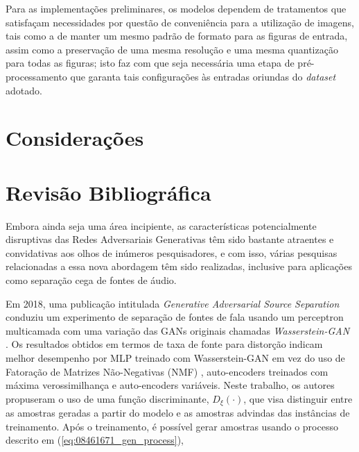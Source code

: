 Para as implementações preliminares, os modelos dependem de tratamentos que satisfaçam necessidades por questão de conveniência para a utilização de imagens, tais como a de manter um mesmo padrão de formato para as figuras de entrada, assim como a preservação de uma mesma resolução e uma mesma quantização para todas as figuras; isto faz com que seja necessária uma etapa de pré-processamento que garanta tais configurações às entradas oriundas do \textit{dataset} adotado.



\section{Considerações}
\label{sec:gan_for_bss_considerations}



\section{Revisão Bibliográfica}
\label{sec:gan_for_bss_bib_review}

Embora ainda seja uma área incipiente, as características potencialmente disruptivas das Redes Adversariais Generativas têm sido bastante atraentes e convidativas aos olhos de inúmeros pesquisadores, e com isso, várias pesquisas relacionadas a essa nova abordagem têm sido realizadas, inclusive para aplicações como separação cega de fontes de áudio.

Em 2018, uma publicação intitulada \textit{Generative Adversarial Source Separation} \citep{8461671} conduziu um experimento de separação de fontes de fala usando um perceptron multicamada com uma variação das GANs originais chamadas \textit{Wasserstein-GAN} \citep{arjovsky2017wasserstein}. Os resultados obtidos em termos de taxa de fonte para distorção indicam melhor desempenho por MLP treinado com Wasserstein-GAN em vez do uso de Fatoração de Matrizes Não-Negativas (NMF) \citep{lee1999learning}, auto-encoders treinados com máxima verossimilhança e auto-encoders variáveis. Neste trabalho, os autores propuseram o uso de uma função discriminante, $D_{\xi}\left(\cdot\right)$, que visa distinguir entre as amostras geradas a partir do modelo e as amostras advindas das instâncias de treinamento. Após o treinamento, é possível gerar amostras usando o processo descrito em (\ref{eq:08461671_gen_process}),

